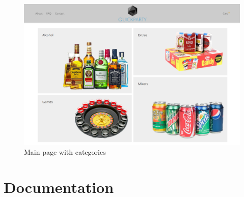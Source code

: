 \documentclass[12p]{article}
\begin{document}
\begin{figure}[ht]
    \centering
    \includegraphics[width=1\textwidth]{main_page}
    \caption{Main page with categories}
    \label{fig:main_page}
\end{figure}


\newpage
\section{Documentation}
\end{document}

